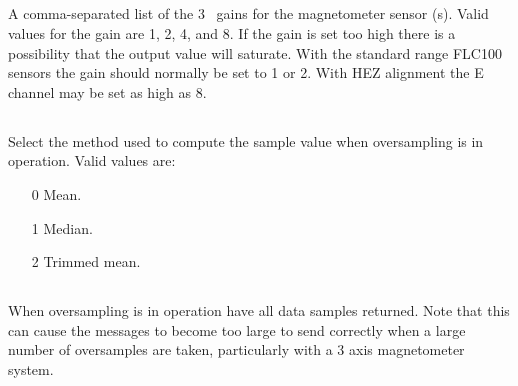 
\subsection{}
A comma-separated list of the 3 \itwoc\ gains for the magnetometer
sensor \adc(s). Valid values for the gain are 1, 2, 4, and 8. If the
gain is set too high there is a possibility that the output value will
saturate. With the standard  range FLC100 sensors the gain
should normally be set to 1 or 2. With HEZ alignment the E channel may
be set as high as 8.


\subsection{}
\label{sec:eeprom-aggregate}
Select the method used to compute the sample value when oversampling
is in operation. Valid values are:
\begin{enumerate}
\item[0] Mean.
\item[1] Median.
\item[2] Trimmed mean.
\end{enumerate}
\subsection{}
\label{sec:eeprom-all-samples}
When oversampling is in operation have all data samples returned. Note
that this can cause the messages to become too large to send correctly
when a large number of oversamples are taken, particularly with a 3
axis magnetometer system.


